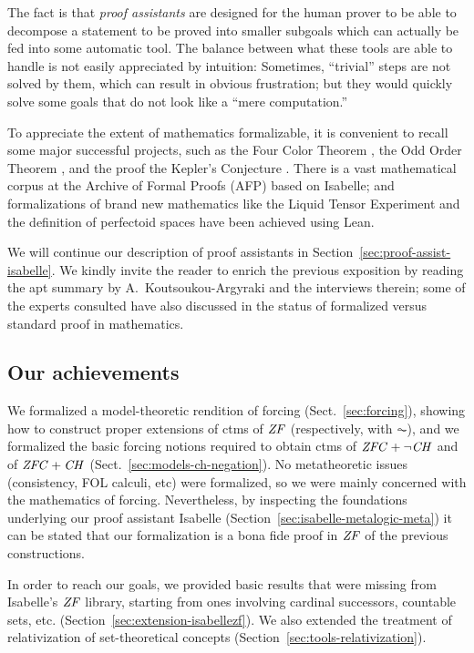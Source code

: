 The fact is that \emph{proof assistants} are designed for the human prover to
be able to decompose a statement to be proved into smaller subgoals
which can actually be fed into some automatic tool. The balance between
what these tools are able to handle is not  easily appreciated by
intuition: Sometimes, ``trivial'' steps are not solved by them, which
can result in obvious frustration; but they would quickly solve some
goals that do not look like a ``mere computation.''

To appreciate the extent of mathematics formalizable, it is convenient to recall
some major successful projects, such as the Four Color Theorem
\cite{MR2463991}, the Odd Order Theorem
\cite{10.1007/978-3-642-39634-2_14}, and the proof the Kepler's
Conjecture \cite{MR3659768}. There is a vast mathematical corpus at
the Archive of Formal Proofs (AFP) based on Isabelle; and formalizations of
brand new mathematics like the Liquid Tensor Experiment
\cite{LTE2020,LTE2021} and the definition of perfectoid spaces \cite{10.1145/3372885.3373830}
have been achieved using Lean.

We will continue our description of proof assistants in
Section~\ref{sec:proof-assist-isabelle}. We kindly invite the reader
to enrich the previous exposition by reading the apt summary by
A.~Koutsoukou-Argyraki \cite{angeliki} and the interviews
therein; some of the experts consulted have also discussed
in \cite{2022arXiv220704779B} the status of formalized versus standard
proof in mathematics.

\subsection{Our achievements}
We formalized a model-theoretic rendition of forcing (Sect.~\ref{sec:forcing}), showing how to
construct proper extensions of ctms of $\mathit{ZF}$ (respectively, with
$\AC$), and we formalized the basic forcing notions required to obtain
ctms of $\mathit{ZFC} + \neg\mathit{CH}$ and of $\mathit{ZFC} + \mathit{CH}$ (Sect.~\ref{sec:models-ch-negation}). No metatheoretic issues
(consistency, FOL calculi, etc) were formalized, so we were mainly
concerned with the mathematics of forcing. Nevertheless, by inspecting
the foundations underlying our proof assistant Isabelle
(Section~\ref{sec:isabelle-metalogic-meta}) it can be stated that our
formalization is a bona fide proof in $\mathit{ZF}$ of the previous
constructions.

In order to reach our goals, we provided basic results that were
missing from Isabelle's $\mathit{ZF}$ library, starting from ones
involving cardinal successors, countable sets, etc.
(Section~\ref{sec:extension-isabellezf}). We also extended the treatment of relativization of
set-theoretical concepts (Section~\ref{sec:tools-relativization}).

